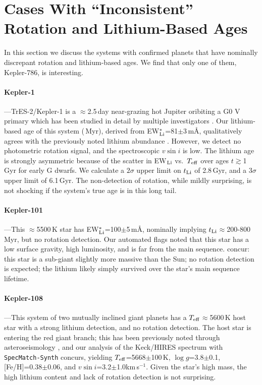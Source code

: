 \documentclass[11pt,twocolumn,tighten]{aastex63}
\newcommand{\kms}{{km\,s$^{-1}$}}
\begin{document}
\section{Cases With ``Inconsistent'' Rotation and Lithium-Based Ages}
\label{app:inconsistent}

In this section we discuss the systems with confirmed planets that
have nominally discrepant rotation and lithium-based ages.  We find
that only one of them, Kepler-786, is interesting.

\paragraph{Kepler-1}---TrES-2/Kepler-1 \citep{2006ApJ...651L..61O} is
a $\approx$2.5\,day near-grazing hot Jupiter oribiting a G0 V primary
which has been studied in detail by multiple investigators
\citep[e.g.][]{2007ApJ...664.1190S,2008ApJ...682.1283W,2011ApJ...733...36K,2011MNRAS.417.2166S}.
Our lithium-based age of this system (\trestwotli\,Myr), derived from
EW$_{\rm Li}^{\ast}$=81$\pm$3\,m\AA, qualitatively agrees with the
previously noted lithium abundance \citep{2007ApJ...664.1190S}.
However, we detect no photometric rotation signal, and the
spectroscopic $v\sin i$ is low.  The lithium age is strongly
asymmetric because of the scatter in EW$_{\rm Li}$ vs.~$T_{\rm eff}$
over ages $t$$\gtrsim$1\,Gyr for early G dwarfs.  We calculate a
$2\sigma$ upper limit on $t_{\rm Li}$ of 2.8\,Gyr, and a $3\sigma$
upper limit of 6.1\,Gyr.  The non-detection of rotation, while mildly
surprising, is not shocking if the system's true age is in this long
tail.

\paragraph{Kepler-101}---This $\approx$5500\,K star has EW$_{\rm
Li}^{\ast}$=100$\pm$5\,m\AA, nominally implying $t_{\rm
Li}$$\approx$200-800\,Myr, but no rotation detection.  Our automated
flags noted that this star has a low surface gravity, high luminosity,
and is far from the main sequence.  \citet{2014A&A...572A...2B}
concur: this star is a sub-giant slightly more massive than the Sun;
no rotation detection is expected; the lithium likely simply survived
over the star's main sequence lifetime.

\paragraph{Kepler-108}---This system of two mutually inclined giant
planets \citep{2017AJ....153...45M} has a $T_{\rm
eff}$$\approx$5600\,K host star with a strong lithium detection, and
no rotation detection.  The host star is entering the red giant
branch; this has been previously noted through asteroseismology
\citep{2013ApJ...767..127H}, and our analysis of the Keck/HIRES
spectrum with \texttt{SpecMatch-Synth} \citep{2017AJ....154..107P}
concurs, yielding $T_{\rm eff}$=5668$\pm$100\,K, $\log g$=3.8$\pm$0.1,
[Fe/H]=0.38$\pm$0.06, and $v\sin i$=3.2$\pm$1.0\kms.  Given the star's
high mass, the high lithium content and lack of rotation detection is
not surprising.
\end{document}
